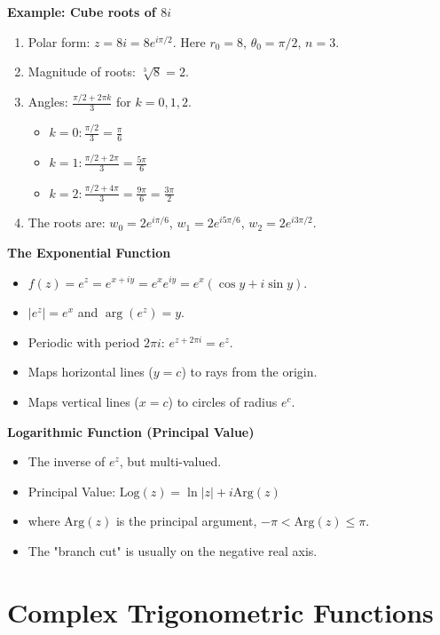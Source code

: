 \documentclass{../cheatsheet}
\begin{document}
\begin{multicols}{3}
\textbf{Example: Cube roots of $8i$}
\begin{enumerate}
    \item Polar form: $z = 8i = 8e^{i\pi/2}$. Here $r_0=8$, $\theta_0=\pi/2$, $n=3$.
    \item Magnitude of roots: $\sqrt[3]{8} = 2$.
    \item Angles: $\frac{\pi/2 + 2\pi k}{3}$ for $k=0,1,2$.
        \begin{itemize}
            \item $k=0: \frac{\pi/2}{3} = \frac{\pi}{6}$
            \item $k=1: \frac{\pi/2 + 2\pi}{3} = \frac{5\pi}{6}$
            \item $k=2: \frac{\pi/2 + 4\pi}{3} = \frac{9\pi}{6} = \frac{3\pi}{2}$
        \end{itemize}
    \item The roots are: $w_0 = 2e^{i\pi/6}$, $w_1 = 2e^{i5\pi/6}$, $w_2 = 2e^{i3\pi/2}$.
\end{enumerate}

\textbf{The Exponential Function}
\begin{itemize}
    \item $f(z) = e^z = e^{x+iy} = e^x e^{iy} = e^x(\cos y + i\sin y)$.
    \item $|e^z| = e^x$ and $\arg(e^z) = y$.
    \item Periodic with period $2\pi i$: $e^{z+2\pi i} = e^z$.
    \item Maps horizontal lines ($y=c$) to rays from the origin.
    \item Maps vertical lines ($x=c$) to circles of radius $e^c$.
\end{itemize}

\textbf{Logarithmic Function (Principal Value)}
\begin{itemize}
    \item The inverse of $e^z$, but multi-valued.
    \item Principal Value: $\text{Log}(z) = \ln|z| + i\text{Arg}(z)$
    \item where $\text{Arg}(z)$ is the principal argument, $-\pi < \text{Arg}(z) \le \pi$.
    \item The "branch cut" is usually on the negative real axis.
\end{itemize}


\section{Complex Trigonometric Functions}


\end{multicols}
\end{document}
